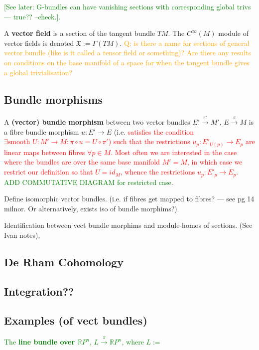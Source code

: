 \documentclass[a4paper]{article}
\theoremstyle{definition} \newtheorem*{definition}{Definition}
\theoremstyle{definition} \newtheorem*{definitions}{Definitions}
\theoremstyle{plain} \newtheorem{theorem}{Theorem}[section]
\theoremstyle{plain} \newtheorem{proposition}[theorem]{Proposition}
\theoremstyle{plain} \newtheorem{corollary}[theorem]{Corollary}
\theoremstyle{plain} \newtheorem{lemma}[theorem]{Lemma}
\theoremstyle{plain} \newtheorem{example}[theorem]{Example}
\newcommand{\checkCorrect}[1]{\textcolor{red}{#1}}
\newcommand{\question}[1]{\textcolor{orange}{#1}}
\newcommand{\finish}[1]{\textcolor{green}{#1}}
\newcommand{\defn}[1]{\textbf{#1}}
\newcommand{\realnos}{\mathbb{R}}
\begin{document}
\finish{[See later: G-bundles can have vanishing sections with corresponding global trivs --- true?? --check.].}

A \defn{vector field} is a section of the tangent bundle $TM$. The $C^\infty (M)$ module of vector fields is denoted $\mathfrak{X}:=\Gamma(TM)$.
\question{Q: is there a name for sections of general vector bundle (like is it called a tensor field or something)?} \question{Are there any results on conditions on the base manifold of a space for when the tangent bundle gives a global trivialisation?} 

\subsection{Bundle morphisms} 

A \defn{(vector) bundle morphism} between two vector bundles $E'\xrightarrow{\pi '} M'$,  $E\xrightarrow{\pi} M$ is a fibre bundle morphism $u:E'\to E$ (i.e. \checkCorrect{satisfies the condition $\exists \textrm{smooth } U:M'\to M: \pi\circ u=U\circ \pi '$) such that the restrictions $u_p:E'_{U(p)}\to E_p$ are linear maps between fibres $\forall p \in M$.
Most often we are interested in the case where the bundles are over the same base manifold $M'=M$, in which case we restrict our definition so that $U=\mathit{id}_M$, whence the restrictions $u_p:E'_p\to E_p$. } \finish{ADD COMMUTATIVE DIAGRAM for restricted case}.

Define isomorphic vector bundles. (i.e. if fibres get mapped to fibres? --- see pg 14 milnor. Or alternatively, exists iso of bundle morphims?)


Identification between vect bundle morphims and module-homos of sections. (See Ivan notes).

\subsection{De Rham Cohomology}

\subsection{Integration??}

\subsection{Examples (of vect bundles)}

\finish{The \defn{line bundle over $\realnos P^n$}, $L\xrightarrow{\pi} \realnos P^n$, where $L:= $}
\end{document}
